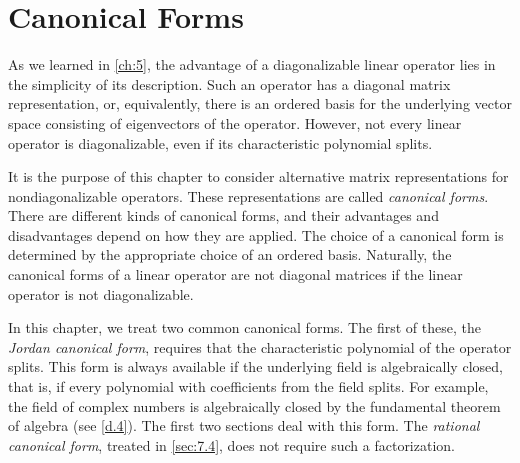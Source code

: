 \chapter{Canonical Forms}\label{ch:7}

\begin{note}
  As we learned in \cref{ch:5}, the advantage of a diagonalizable linear operator lies in the simplicity of its description.
  Such an operator has a diagonal matrix representation, or, equivalently, there is an ordered basis for the underlying vector space consisting of eigenvectors of the operator.
  However, not every linear operator is diagonalizable, even if its characteristic polynomial splits.

  It is the purpose of this chapter to consider alternative matrix representations for nondiagonalizable operators.
  These representations are called \emph{canonical forms}.
  There are different kinds of canonical forms, and their advantages and disadvantages depend on how they are applied.
  The choice of a canonical form is determined by the appropriate choice of an ordered basis.
  Naturally, the canonical forms of a linear operator are not diagonal matrices if the linear operator is not diagonalizable.

  In this chapter, we treat two common canonical forms.
  The first of these, the \emph{Jordan canonical form}, requires that the characteristic polynomial of the operator splits.
  This form is always available if the underlying field is algebraically closed, that is, if every polynomial with coefficients from the field splits.
  For example, the field of complex numbers is algebraically closed by the fundamental theorem of algebra (see \cref{d.4}).
  The first two sections deal with this form.
  The \emph{rational canonical form}, treated in \cref{sec:7.4}, does not require such a factorization.
\end{note}





